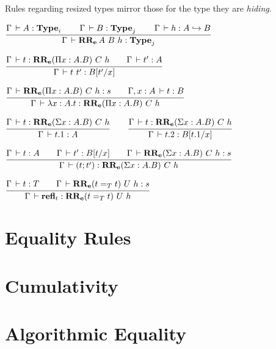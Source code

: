 \documentclass[a4paper,english]{lipics-utf8x}
\begin{document}
  \noindent %
  Rules regarding resized types mirror those for the type they are
  \emph{hiding}.

  \begin{center}
  \(
    \ru{\Gamma \der A : \Type_i \qquad
        \Gamma \der B : \Type_j \qquad
        \Gamma \der h : \emb{A}{B}
      }{\Gamma \der \RRe{A}{B}{h} : \Type_j}
  \)
  \end{center}

  \begin{center}
  \(
    \ru{\Gamma \der t : \RRe{(\Pi x:A.B)}{C}{h} \qquad
        \Gamma \der t' : A
      }{\Gamma \der t\ t' : B[t'/x]}
  \)
  \end{center}

  \begin{center}
  \(
    \ru{\Gamma \der \RRe{(\Pi x:A.B)}{C}{h} : s \qquad
        \Gamma, x:A \der t : B
      }{\Gamma \der \lambda x:A.t : \RRe{(\Pi x:A.B)}{C}{h}}
  \)
  \end{center}

  \begin{center}
  \(
    \ru{\Gamma \der t : \RRe{(\Sigma x:A.B)}{C}{h}
      }{\Gamma \der t.1 : A}
    \qquad
    \ru{\Gamma \der t : \RRe{(\Sigma x:A.B)}{C}{h}
      }{\Gamma \der t.2 : B[t.1/x]}
  \)
  \end{center}

  \begin{center}
  \(
    \ru{\Gamma \der t : A \qquad
        \Gamma \der t' : B[t/x] \qquad
        \Gamma \der \RRe{(\Sigma x:A.B)}{C}{h} : s
      }{\Gamma \der (t;t') : \RRe{(\Sigma x:A.B)}{C}{h}}
  \)
  \end{center}

  \begin{center}
  \(
    \ru{\Gamma \der t : T \qquad
        \Gamma \der \RRe{(t =_T t)}{U}{h} : s
      }{\Gamma \der \refl_t : \RRe{(t =_T t)}{U}{h}}
  \)
  \end{center}

\section{Equality Rules}

\section{Cumulativity}

\section{Algorithmic Equality}
\end{document}
